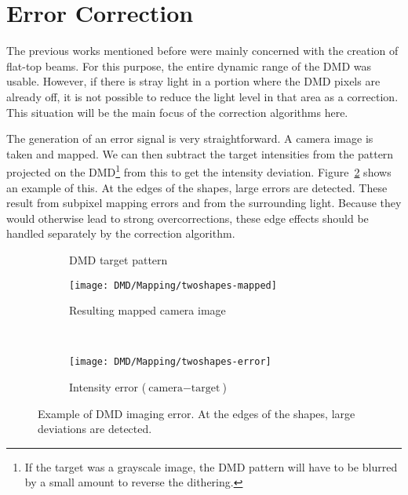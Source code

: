 \section{Error Correction}
\label{sec:dmd_error_correction_theory}
The previous works mentioned before were mainly concerned with the creation of flat-top beams. For this purpose, the entire dynamic range of the DMD was usable. However, if there is stray light in a portion where the DMD pixels are already off, it is not possible to reduce the light level in that area as a correction. This situation will be the main focus of the correction algorithms here.

The generation of an error signal is very straightforward. A camera image is taken and mapped. We can then subtract the target intensities from the pattern projected on the DMD\footnote{If the target was a grayscale image, the DMD pattern will have to be blurred by a small amount to reverse the dithering.} from this to get the intensity deviation. Figure~\ref{fig:imaging_error_example} shows an example of this. At the edges of the shapes, large errors are detected. These result from subpixel mapping errors and from the surrounding light. Because they would otherwise lead to strong overcorrections, these edge effects should be handled separately by the correction algorithm.
\begin{figure}[hbp]
    \centering
    \begin{subfigure}[t]{0.43\textwidth}
        \centering
        \caption{DMD target pattern}
        \label{fig:imaging_error_target}
    \end{subfigure}
    \begin{subfigure}[t]{0.43\textwidth}
        \centering
        \texttt{[image: DMD/Mapping/twoshapes-mapped]}
        \caption{Resulting mapped camera image}
    \end{subfigure} \\ \vspace{1ex}
    \begin{subfigure}[t]{\textwidth}
        \centering
        \texttt{[image: DMD/Mapping/twoshapes-error]}
        \caption{Intensity error ($\text{camera} - \text{target}$)}
    \end{subfigure}
    \caption[Example of DMD imaging error]{Example of DMD imaging error. At the edges of the shapes, large deviations are detected.}
    \label{fig:imaging_error_example}
\end{figure}

